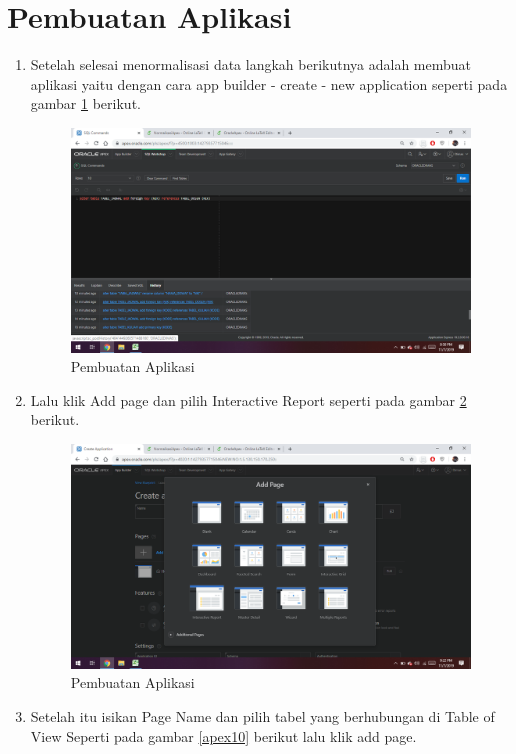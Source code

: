 \documentclass[12pt, times new roman, a4paper]{article}
\begin{document}
\section{Pembuatan Aplikasi}
\begin{enumerate}
    \item Setelah selesai menormalisasi data langkah berikutnya adalah membuat aplikasi yaitu dengan cara app builder - create - new application seperti pada gambar \ref{apex8} berikut.
            \begin{figure}[!htbp]
        \centering
        \includegraphics[scale=0.25]{figures/apex7.png}
        \caption{Pembuatan Aplikasi}
        \label{apex8}
    \end{figure}
    \item Lalu klik Add page dan pilih Interactive Report seperti pada gambar \ref{apex9} berikut.
                \begin{figure}[!htbp]
        \centering
        \includegraphics[scale=0.25]{figures/apex9.png}
        \caption{Pembuatan Aplikasi}
        \label{apex9}
    \end{figure}
    \item Setelah itu isikan Page Name dan pilih tabel yang berhubungan di Table of View Seperti pada gambar \ref{apex10} berikut lalu klik add page.

\end{enumerate}
\end{document}
